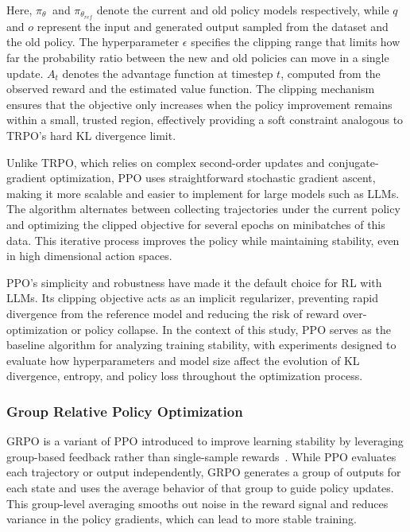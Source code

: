 Here, ${\pi_{\theta}} \ $ and ${\pi_{\theta_{ref}}}$ denote the current and old policy models respectively, while $q$ and $o$ represent the input and generated output sampled from the dataset and the old policy. The hyperparameter $\epsilon$ specifies the clipping range that limits how far the probability ratio between the new and old policies can move in a single update. $ A_t $ denotes the advantage function at timestep $t$, computed from the observed reward and the estimated value function. The clipping mechanism ensures that the objective only increases when the policy improvement remains within a small, trusted region, effectively providing a soft constraint analogous to TRPO’s hard KL divergence limit.

Unlike TRPO, which relies on complex second-order updates and conjugate-gradient optimization, PPO uses straightforward stochastic gradient ascent, making it more scalable and easier to implement for large models such as LLMs. The algorithm alternates between collecting trajectories under the current policy and optimizing the clipped objective for several epochs on minibatches of this data. This iterative process improves the policy while maintaining stability, even in high dimensional action spaces.

PPO’s simplicity and robustness have made it the default choice for RL with LLMs. Its clipping objective acts as an implicit regularizer, preventing rapid divergence from the reference model and reducing the risk of reward over-optimization or policy collapse. In the context of this study, PPO serves as the baseline algorithm for analyzing training stability, with experiments designed to evaluate how hyperparameters and model size affect the evolution of KL divergence, entropy, and policy loss throughout the optimization process.

\subsubsection{Group Relative Policy Optimization}
GRPO is a variant of PPO introduced to improve learning stability by leveraging group-based feedback rather than single-sample rewards~\cite{shao2024deepseekmath}. While PPO evaluates each trajectory or output independently, GRPO generates a group of outputs for each state and uses the average behavior of that group to guide policy updates. This group-level averaging smooths out noise in the reward signal and reduces variance in the policy gradients, which can lead to more stable training.

